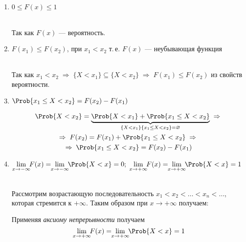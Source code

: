 \begin{enumerate}
	\item $0 \leq F(x) \leq 1$
	\begin{Proof}\\
		Так как $F(x)$ --- вероятность.\\
	\end{Proof}
	
	\item $F(x_1) \leq F(x_2)$, при $x_1 < x_2$ т.\,е. $F(x)$ --- неубывающая функция
	\begin{Proof}\\
		Так как $x_1 < x_2 \;\Rightarrow\; \{X < x_1\} \subseteq \{X < x_2\} \;\Rightarrow\; F(x_1) \leq F(x_2)$ из свойств вероятности.\\
	\end{Proof}
	
	\item $\Prob\{x_1 \leq X < x_2\} = F(x_2) - F(x_1)$
	\begin{Proof}
		\begin{multline*}
			\Prob\{X < x_2\} = \underbrace{\Prob\{X < x_1\} + \Prob\{x_1 \leq X < x_2\}}_{\{X < x_1\}\{x_1 \leq X < x_2\} = \emptyset} \;\Rightarrow\; \\
			\Rightarrow\; F(x_2) = F(x_1) + \Prob\{x_1 \leq X < x_2\} \;\Rightarrow\;\\
			\Rightarrow\; \Prob\{x_1 \leq X < x_2\} = F(x_2) - F(x_1)
		\end{multline*}
	\end{Proof}
	
	\item $\lim\limits_{x \to -\infty} \!\!F(x) = \!\!\lim\limits_{x \to -\infty} \!\!\Prob\{X < x\} = 0;\; \lim\limits_{x \to +\infty} \!\!F(x) = \!\!\lim\limits_{x \to +\infty} \!\!\Prob\{X < x\} = 1$
	\begin{Proof}\\
		Рассмотрим возрастающую последовательность $x_1 < x_2 < \dots < x_n < \dots$, которая стремится к $+\infty$. Таким образом при $x \to +\infty$ получаем:
		Применяя \textit{аксиому непрерывности} получаем
		\[
			\lim\limits_{x \to +\infty} \!\!F(x) = \!\!\lim\limits_{x \to +\infty} \!\!\Prob\{X < x\} = 1
		\]
	\end{Proof}
	

\end{enumerate}
